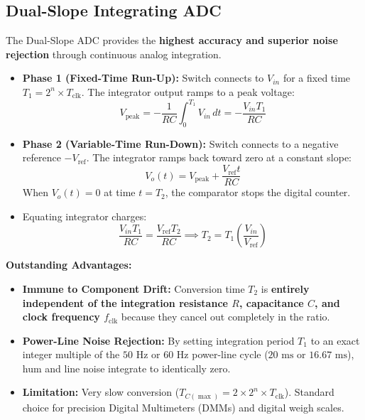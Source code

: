\documentclass[12pt,a4paper]{article}
\begin{document}
\subsection{Dual-Slope Integrating ADC}
The Dual-Slope ADC provides the \textbf{highest accuracy and superior noise rejection} through continuous analog integration.

\begin{tcolorbox}[defbox, title={\textbf{Dual-Slope Conversion Derivation}}]
\begin{itemize}[leftmargin=*, itemsep=3pt]
  \item \textbf{Phase 1 (Fixed-Time Run-Up):} Switch connects to $V_{in}$ for a fixed time $T_1 = 2^n \times T_{\text{clk}}$. The integrator output ramps to a peak voltage:
  \begin{equation}
    V_{\text{peak}} = -\frac{1}{RC} \int_{0}^{T_1} V_{in} \, dt = -\frac{V_{in} T_1}{RC}
  \end{equation}
  \item \textbf{Phase 2 (Variable-Time Run-Down):} Switch connects to a negative reference $-V_{\text{ref}}$. The integrator ramps back toward zero at a constant slope:
  \begin{equation}
    V_o(t) = V_{\text{peak}} + \frac{V_{\text{ref}} t}{RC}
  \end{equation}
  When $V_o(t) = 0$ at time $t = T_2$, the comparator stops the digital counter.
  \item Equating integrator charges:
  \begin{equation}
    \frac{V_{in} T_1}{RC} = \frac{V_{\text{ref}} T_2}{RC} \implies T_2 = T_1 \left(\frac{V_{in}}{V_{\text{ref}}}\right)
  \end{equation}
\end{itemize}
\end{tcolorbox}

\textbf{Outstanding Advantages:}
\begin{itemize}[leftmargin=*, itemsep=2pt]
  \item \textbf{Immune to Component Drift:} Conversion time $T_2$ is \textbf{entirely independent of the integration resistance $R$, capacitance $C$, and clock frequency $f_{\text{clk}}$} because they cancel out completely in the ratio.
  \item \textbf{Power-Line Noise Rejection:} By setting integration period $T_1$ to an exact integer multiple of the $50\text{ Hz}$ or $60\text{ Hz}$ power-line cycle ($20\text{ ms}$ or $16.67\text{ ms}$), hum and line noise integrate to identically zero.
  \item \textbf{Limitation:} Very slow conversion ($T_{C(\max)} = 2 \times 2^n \times T_{\text{clk}}$). Standard choice for precision Digital Multimeters (DMMs) and digital weigh scales.
\end{itemize}
\end{document}
